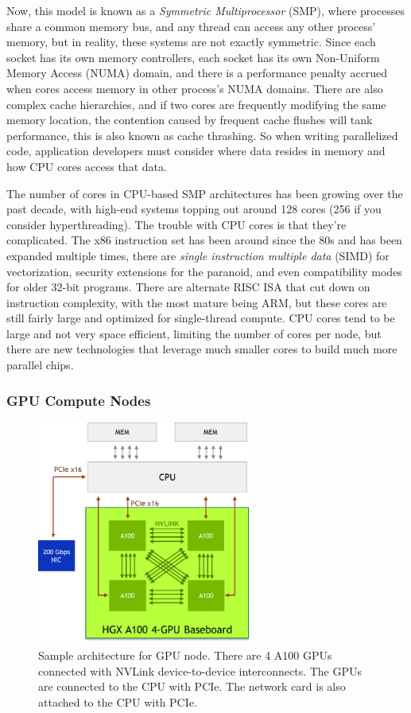 Now, this model is known as a \textit{Symmetric Multiprocessor} (SMP), where processes share a common memory bus, and any thread can access any other process' memory, but in reality, these systems are not exactly symmetric. 
Since each socket has its own memory controllers, each socket has its own Non-Uniform Memory Access (NUMA) domain, and there is a performance penalty accrued when cores access memory in other process's NUMA domains.
There are also complex cache hierarchies, and if two cores are frequently modifying the same memory location, the contention caused by frequent cache flushes will tank performance, this is also known as cache thrashing.
So when writing parallelized code, application developers must consider where data resides in memory and how CPU cores access that data.
 
The number of cores in CPU-based SMP architectures has been growing over the past decade, with high-end systems topping out around 128 cores (256 if you consider hyperthreading).
The trouble with CPU cores is that they're complicated.
The x86 instruction set has been around since the 80s and has been expanded multiple times, there are \textit{single instruction multiple data} (SIMD) for vectorization, security extensions for the paranoid, and even compatibility modes for older 32-bit programs. 
There are alternate RISC ISA that cut down on instruction complexity, with the most mature being ARM, but these cores are still fairly large and optimized for single-thread compute.
CPU cores tend to be large and not very space efficient, limiting the number of cores per node, but there are new technologies that leverage much smaller cores to build much more parallel chips. 

\subsubsection{GPU Compute Nodes}

\begin{figure}
    \centering
    \includegraphics[width=7cm]{3_Chapters/2_Chapter_Background/Figs/Nvidia_Redstone.png}
    \caption{
    Sample architecture for GPU node.
    There are 4 A100 GPUs connected with NVLink device-to-device interconnects. 
    The GPUs are connected to the CPU with PCIe. 
    The network card is also attached to the CPU with PCIe.}
    \label{fig:nvidia_redstone}
\end{figure}

